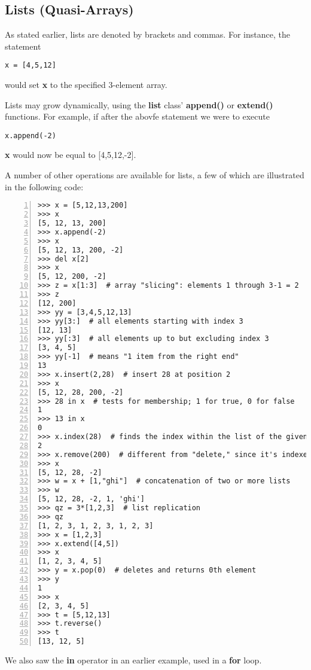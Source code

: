 \subsection{Lists (Quasi-Arrays)}

As stated earlier, lists are denoted by brackets and commas.  For
instance, the statement

\begin{Verbatim}[fontsize=\relsize{-2}]
x = [4,5,12]
\end{Verbatim}

would set {\bf x} to the specified 3-element array.  

Lists may grow dynamically, using the {\bf list} class' {\bf append()}
or {\bf extend()} functions.  For example, if after the abovfe statement
we were to execute

\begin{Verbatim}[fontsize=\relsize{-2}]
x.append(-2)
\end{Verbatim}

{\bf x} would now be equal to [4,5,12,-2].

A number of other operations are available for lists, a few of which are
illustrated in the following code:  

\begin{Verbatim}[fontsize=\relsize{-2},numbers=left]
>>> x = [5,12,13,200]
>>> x
[5, 12, 13, 200]
>>> x.append(-2)
>>> x
[5, 12, 13, 200, -2]
>>> del x[2]
>>> x
[5, 12, 200, -2]
>>> z = x[1:3]  # array "slicing": elements 1 through 3-1 = 2
>>> z
[12, 200]
>>> yy = [3,4,5,12,13]
>>> yy[3:]  # all elements starting with index 3
[12, 13]
>>> yy[:3]  # all elements up to but excluding index 3
[3, 4, 5]
>>> yy[-1]  # means "1 item from the right end"
13
>>> x.insert(2,28)  # insert 28 at position 2
>>> x
[5, 12, 28, 200, -2]
>>> 28 in x  # tests for membership; 1 for true, 0 for false 
1
>>> 13 in x
0
>>> x.index(28)  # finds the index within the list of the given value
2
>>> x.remove(200)  # different from "delete," since it's indexed by value
>>> x
[5, 12, 28, -2]
>>> w = x + [1,"ghi"]  # concatenation of two or more lists
>>> w
[5, 12, 28, -2, 1, 'ghi']
>>> qz = 3*[1,2,3]  # list replication
>>> qz
[1, 2, 3, 1, 2, 3, 1, 2, 3]
>>> x = [1,2,3]
>>> x.extend([4,5])
>>> x
[1, 2, 3, 4, 5]
>>> y = x.pop(0)  # deletes and returns 0th element
>>> y
1
>>> x
[2, 3, 4, 5]
>>> t = [5,12,13]
>>> t.reverse()
>>> t
[13, 12, 5]
\end{Verbatim}

We also saw the {\bf in} operator in an earlier example, used in a {\bf
for} loop.

